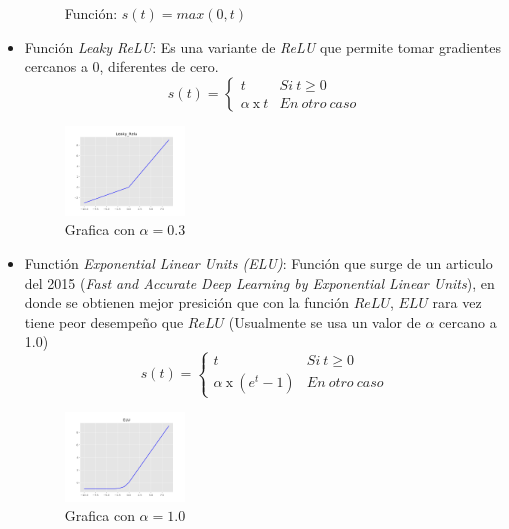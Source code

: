 \documentclass{article}
\begin{document}
\begin{itemize}
\begin{figure}[H]
  \caption{Función: $s(t) = max(0,t)$}
 \end{figure}
 \item Función \textit{Leaky ReLU}: Es una variante de \textit{ReLU} que permite tomar gradientes cercanos a 0, diferentes 
 de cero. 
 \[ s(t) = \left \{ 
               \begin{array}{cc}
                t &  Si\ t \geq 0 \\
                \alpha \ \text{x}\  t &  En \ otro \ caso
               \end{array}
           \right .
  \]   
 \begin{figure}[H]
  \centering
  \includegraphics[width=0.3\textwidth]{images/Leaky_Relu.png}
  \caption{Grafica con $\alpha = 0.3$}
 \end{figure}

\item Functión \textit{Exponential Linear Units (ELU)}: Función que surge de un articulo del 2015
(\textit{Fast and Accurate Deep Learning by Exponential Linear Units}), en donde 
se obtienen mejor presición que con la función  $ReLU$, $ELU$ rara vez tiene peor desempeño que $ReLU$ (Usualmente se 
usa un valor de $\alpha$ cercano a 1.0)
 \[ s(t) = \left \{ 
               \begin{array}{cc}
                t &  Si\ t \geq 0 \\
                \alpha \ \text{x}\ (e^{t}-1) &  En \ otro \ caso
               \end{array}
           \right .
  \]   
 \begin{figure}[H]
  \centering
  \includegraphics[width=0.3\textwidth]{images/ELU.png}
  \caption{Grafica con $\alpha = 1.0$}
 \end{figure}
\end{itemize}
\end{document}
